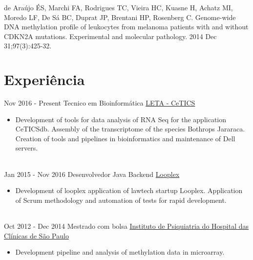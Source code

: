 \documentclass[letterpaper]{twentysecondcv} %
\begin{document}
de Araújo ÉS, Marchi FA, Rodrigues TC, Vieira HC, Kuasne H, Achatz MI, Moredo LF, De Sá BC, Duprat JP, Brentani HP, Rosenberg C. Genome-wide DNA methylation profile of leukocytes from melanoma patients with and without CDKN2A mutations. Experimental and molecular pathology. 2014 Dec 31;97(3):425-32. \vspace{2mm}


\section{Experiência}

\begin{twenty} %
\twentyitem
    	{Nov 2016 - }
		{Present}
        {Tecnico em Bioinformática}
        {\href{http://cetics.butantan.gov.br/}{LETA - CeTICS}}
        {}
        {\begin{itemize}
        \item Development of tools for data analysis of RNA Seq for the application CeTICSdb. Assembly of the transcriptome of the species Bothrops Jararaca. Creation of tools and pipelines in bioinformatics and maintenance of Dell servers.
        \end{itemize}}
        \\
	\twentyitem
    	{Jan 2015 - }
		{Nov 2016}
        {Desenvolvedor Java Backend}
        {\href{www.looplex.com.br/}{Looplex}}
        {}
        {
        {\begin{itemize}
        \item Development of looplex application of lawtech startup Looplex. Application of Scrum methodology and automation of tests for rapid development. 
    \end{itemize}}
        }
    \\   
    \twentyitem
   		{Oct 2012 - }
		{Dec 2014}
        {Mestrado com bolsa}
        {\href{www.ipqhc.org.br}{Instituto de Psiquiatria do Hospital das Clínicas de São Paulo}}
        {}
        {
        {\begin{itemize}
        \item Development pipeline and analysis of methylation data in microarray.
    \end{itemize}}
        }       
\end{twenty}
\end{document}
